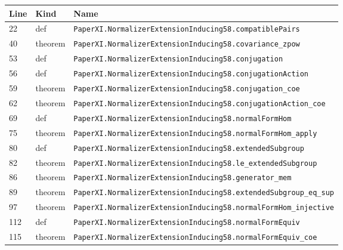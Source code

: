 \documentclass[10pt,oneside]{book}
\begin{document}
\begin{longtable}{@{}p{}p{}p{}@{}}\toprule Line&Kind&Name\\\midrule\endhead

22&def&\nolinkurl{PaperXI.NormalizerExtensionInducing58.compatiblePairs}\\

40&theorem&\nolinkurl{PaperXI.NormalizerExtensionInducing58.covariance_zpow}\\

53&def&\nolinkurl{PaperXI.NormalizerExtensionInducing58.conjugation}\\

56&def&\nolinkurl{PaperXI.NormalizerExtensionInducing58.conjugationAction}\\

59&theorem&\nolinkurl{PaperXI.NormalizerExtensionInducing58.conjugation_coe}\\

62&theorem&\nolinkurl{PaperXI.NormalizerExtensionInducing58.conjugationAction_coe}\\

69&def&\nolinkurl{PaperXI.NormalizerExtensionInducing58.normalFormHom}\\

75&theorem&\nolinkurl{PaperXI.NormalizerExtensionInducing58.normalFormHom_apply}\\

80&def&\nolinkurl{PaperXI.NormalizerExtensionInducing58.extendedSubgroup}\\

82&theorem&\nolinkurl{PaperXI.NormalizerExtensionInducing58.le_extendedSubgroup}\\

86&theorem&\nolinkurl{PaperXI.NormalizerExtensionInducing58.generator_mem}\\

89&theorem&\nolinkurl{PaperXI.NormalizerExtensionInducing58.extendedSubgroup_eq_sup}\\

97&theorem&\nolinkurl{PaperXI.NormalizerExtensionInducing58.normalFormHom_injective}\\

112&def&\nolinkurl{PaperXI.NormalizerExtensionInducing58.normalFormEquiv}\\

115&theorem&\nolinkurl{PaperXI.NormalizerExtensionInducing58.normalFormEquiv_coe}\\


\end{longtable}
\end{document}
